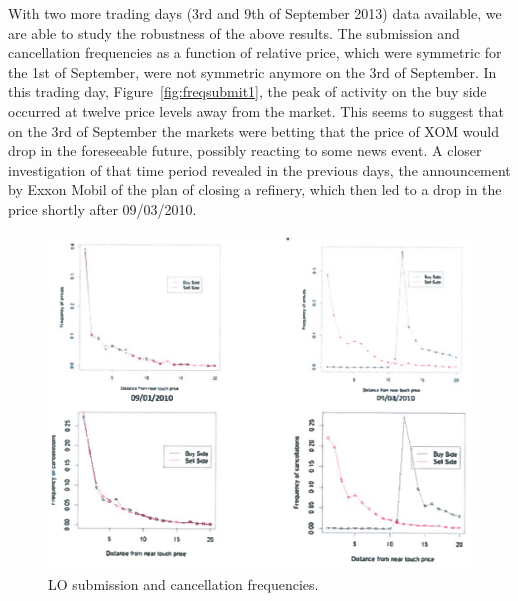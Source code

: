 With two more trading days (3rd and 9th of September 2013) data available, we are able to study the robustness of the above results. The submission and cancellation frequencies as a function of relative price, which were symmetric for the 1st of September, were not symmetric anymore on the 3rd of September. In this trading day, Figure~\ref{fig:freqsubmit1}, the peak of activity on the buy side occurred at twelve price levels away from the market. This seems to suggest that on the 3rd of September the markets were betting that the price of XOM would drop in the foreseeable future, possibly reacting to some news event. A closer investigation of that time period revealed in the previous days, the announcement by Exxon Mobil of the plan of closing a refinery, which then led to a drop in the price shortly after 09/03/2010.
	\begin{figure}[!ht]
   	\centering
   	\includegraphics[width=\textwidth]{chapters/chapter_trade_data_models/figures/losubcanfreq.png} 
   	\caption{LO submission and cancellation frequencies.\label{fig:losubcanfreq}}
	\end{figure}



